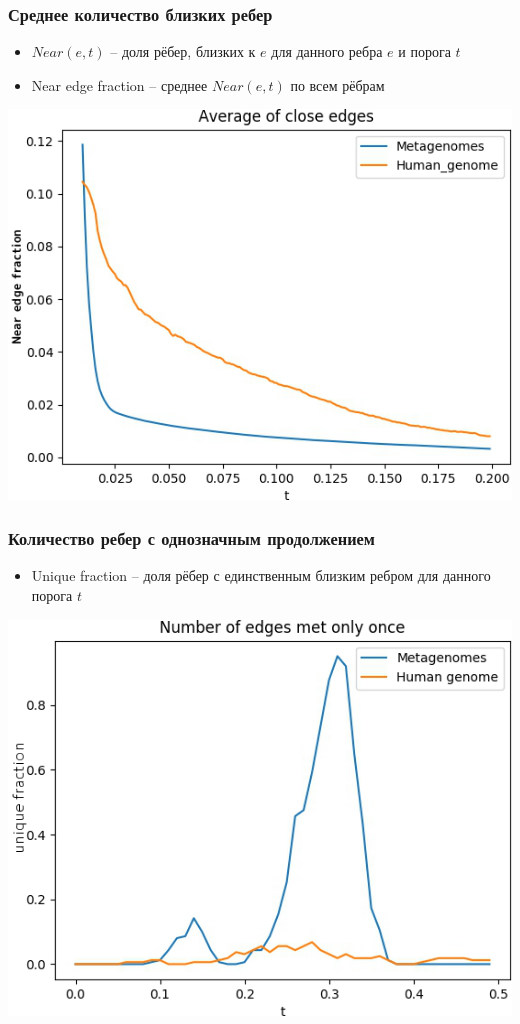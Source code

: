 \documentclass[12pt,pdf,hyperref={unicode}]{beamer}
\begin{document}
\begin{frame}
\frametitle{Среднее количество близких ребер}
\begin{itemize}
 \item $Near(e, t)$ -- доля рёбер, близких к $e$ для данного ребра $e$ и порога $t$ 
 \item Near edge fraction -- среднее $Near(e, t)$ по всем рёбрам
\end{itemize}

\center 
\includegraphics[scale=0.4]{average.png}
\end{frame}

\begin{frame}
\frametitle{Количество ребер с однозначным продолжением}
\begin{itemize}
 \item Unique fraction -- доля рёбер с единственным близким ребром для данного порога $t$
\end{itemize}

\center
\includegraphics[scale=0.4]{unique.png}

\end{frame}
\end{document}
